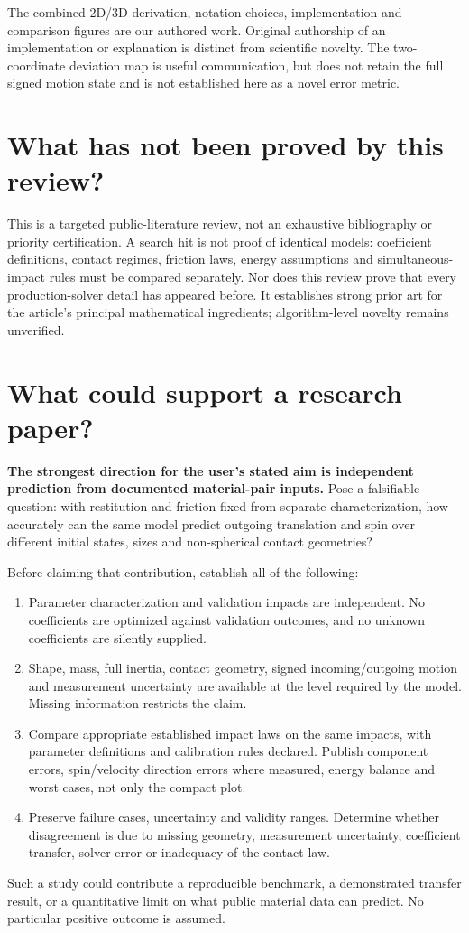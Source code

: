 \documentclass[11pt,a4paper]{article}
\begin{document}
The combined 2D/3D derivation, notation choices, implementation and comparison figures are our authored work. Original authorship of an implementation or explanation is distinct from scientific novelty. The two-coordinate deviation map is useful communication, but does not retain the full signed motion state and is not established here as a novel error metric.

\section{What has not been proved by this review?}
This is a targeted public-literature review, not an exhaustive bibliography or priority certification. A search hit is not proof of identical models: coefficient definitions, contact regimes, friction laws, energy assumptions and simultaneous-impact rules must be compared separately. Nor does this review prove that every production-solver detail has appeared before. It establishes strong prior art for the article's principal mathematical ingredients; algorithm-level novelty remains unverified.

\clearpage
\section{What could support a research paper?}
\textbf{The strongest direction for the user's stated aim is independent prediction from documented material-pair inputs.} Pose a falsifiable question: with restitution and friction fixed from separate characterization, how accurately can the same model predict outgoing translation and spin over different initial states, sizes and non-spherical contact geometries?

Before claiming that contribution, establish all of the following:
\begin{enumerate}
\item Parameter characterization and validation impacts are independent. No coefficients are optimized against validation outcomes, and no unknown coefficients are silently supplied.
\item Shape, mass, full inertia, contact geometry, signed incoming/outgoing motion and measurement uncertainty are available at the level required by the model. Missing information restricts the claim.
\item Compare appropriate established impact laws on the same impacts, with parameter definitions and calibration rules declared. Publish component errors, spin/velocity direction errors where measured, energy balance and worst cases, not only the compact plot.
\item Preserve failure cases, uncertainty and validity ranges. Determine whether disagreement is due to missing geometry, measurement uncertainty, coefficient transfer, solver error or inadequacy of the contact law.
\end{enumerate}
Such a study could contribute a reproducible benchmark, a demonstrated transfer result, or a quantitative limit on what public material data can predict. No particular positive outcome is assumed.
\end{document}
